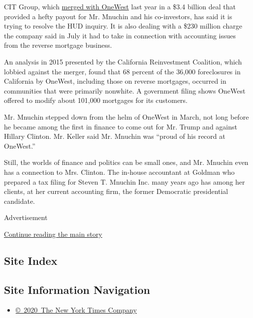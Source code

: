 CIT Group, which
\href{https://www.nytimes.com/2015/07/22/business/dealbook/regulators-approve-merger-of-cit-and-onewest-in-3-4-billion-deal.html}{merged
with OneWest} last year in a \$3.4 billion deal that provided a hefty
payout for Mr. Mnuchin and his co-investors, has said it is trying to
resolve the HUD inquiry. It is also dealing with a \$230 million charge
the company said in July it had to take in connection with accounting
issues from the reverse mortgage business.

An analysis in 2015 presented by the California Reinvestment Coalition,
which lobbied against the merger, found that 68 percent of the 36,000
foreclosures in California by OneWest, including those on reverse
mortgages, occurred in communities that were primarily nonwhite. A
government filing shows OneWest offered to modify about 101,000
mortgages for its customers.

Mr. Mnuchin stepped down from the helm of OneWest in March, not long
before he became among the first in finance to come out for Mr. Trump
and against Hillary Clinton. Mr. Keller said Mr. Mnuchin was ``proud of
his record at OneWest.''

Still, the worlds of finance and politics can be small ones, and Mr.
Mnuchin even has a connection to Mrs. Clinton. The in-house accountant
at Goldman who prepared a tax filing for Steven T. Mnuchin Inc. many
years ago has among her clients, at her current accounting firm, the
former Democratic presidential candidate.

Advertisement

\protect\hyperlink{after-bottom}{Continue reading the main story}

\hypertarget{site-index}{%
\subsection{Site Index}\label{site-index}}

\hypertarget{site-information-navigation}{%
\subsection{Site Information
Navigation}\label{site-information-navigation}}

\begin{itemize}
\tightlist
\item
  \href{https://help.nytimes.com/hc/en-us/articles/115014792127-Copyright-notice}{©~2020~The
  New York Times Company}
\end{itemize}

